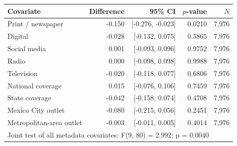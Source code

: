 \begin{tabular}{lrrrr}
\toprule
Covariate & Difference & 95\% CI & $p$-value & $N$ \\
\midrule
Print / newspaper & -0.150 & [-0.276, -0.023] & 0.0210 & 7,976 \\
Digital & -0.028 & [-0.132, 0.075] & 0.5865 & 7,976 \\
Social media & 0.001 & [-0.093, 0.096] & 0.9752 & 7,976 \\
Radio & 0.000 & [-0.098, 0.098] & 0.9988 & 7,976 \\
Television & -0.020 & [-0.118, 0.077] & 0.6806 & 7,976 \\
National coverage & 0.015 & [-0.076, 0.106] & 0.7459 & 7,976 \\
State coverage & -0.042 & [-0.158, 0.074] & 0.4708 & 7,976 \\
Mexico City outlet & -0.080 & [-0.215, 0.056] & 0.2451 & 7,976 \\
Metropolitan-area outlet & -0.003 & [-0.011, 0.005] & 0.4014 & 7,976 \\
\midrule
\multicolumn{5}{l}{Joint test of all metadata covariates: F(9, 80) = 2.992; p = 0.0040} \\
\bottomrule
\end{tabular}
